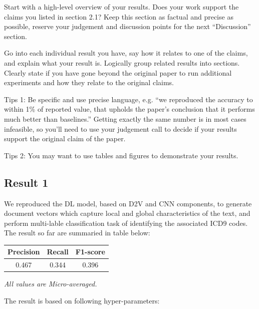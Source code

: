 \documentclass[11pt,a4paper]{article}
\begin{document}
Start with a high-level overview of your results. Does your work support the claims you listed in section 2.1? Keep this section as factual and precise as possible, reserve your judgement and discussion points for the next ``Discussion'' section. 

Go into each individual result you have, say how it relates to one of the claims, and explain what your result is. Logically group related results into sections. Clearly state if you have gone beyond the original paper to run additional experiments and how they relate to the original claims. 

Tips 1: Be specific and use precise language, e.g. ``we reproduced the accuracy to within 1\% of reported value, that upholds the paper's conclusion that it performs much better than baselines.'' Getting exactly the same number is in most cases infeasible, so you'll need to use your judgement call to decide if your results support the original claim of the paper. 

Tips 2: You may want to use tables and figures to demonstrate your results.


\subsection{Result 1}

We reproduced the DL model, based on D2V and CNN components, to generate document vectors which capture local and global characteristics of the text, and perform multi-lable classification task of identifying the associated ICD9 codes. The result so far are summaried in table below:
\newline

\begin{small}
\begin{tabular}{ ccc }
  \hline
  	Precision & Recall & F1-score \\
  \hline
  	0.467 & 0.344 & 0.396 \\
  \hline
\end{tabular}

\textit{All values are Micro-averaged.}
\end{small}
\newline

The result is based on following hyper-parameters:
\newline
\end{document}
